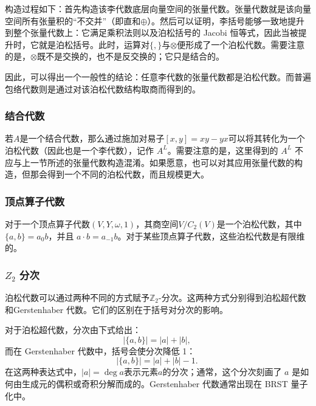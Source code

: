 构造过程如下：首先构造该李代数底层向量空间的张量代数。张量代数就是该向量空间所有张量积的“不交并”（即直和$\oplus$）。然后可以证明，李括号能够一致地提升到整个张量代数上：它满足乘积法则以及泊松括号的 Jacobi 恒等式，因此当被提升时，它就是泊松括号。此时，运算对$\{,\}$与$\otimes$便形成了一个泊松代数。需要注意的是，$\otimes$既不是交换的，也不是反交换的；它只是结合的。

因此，可以得出一个一般性的结论：任意李代数的张量代数都是泊松代数。而普遍包络代数则是通过对该泊松代数结构取商而得到的。
\subsubsection{结合代数}
若$A$是一个结合代数，那么通过施加对易子$[x,y] = xy - yx$可以将其转化为一个泊松代数（因此也是一个李代数），记作 $A^L$。需要注意的是，这里得到的 $A^L$ 不应与上一节所述的张量代数构造混淆。如果愿意，也可以对其应用张量代数的构造，但那会得到一个不同的泊松代数，而且规模更大。
\subsubsection{顶点算子代数}
对于一个顶点算子代数$(V, Y, \omega, 1)$，其商空间$V / C_2(V)$是一个泊松代数，其中$\{a, b\} = a_0 b$，并且 $a \cdot b = a_{-1} b$。对于某些顶点算子代数，这些泊松代数是有限维的。
\subsubsection{ \(Z_2\) 分次}
泊松代数可以通过两种不同的方式赋予$\mathbb{Z}_2$-分次。这两种方式分别得到泊松超代数和Gerstenhaber 代数。它们的区别在于括号对分次的影响。

对于泊松超代数，分次由下式给出：
$$
|\{a,b\}| = |a| + |b|,~
$$
而在 Gerstenhaber 代数中，括号会使分次降低 1：
$$
|\{a,b\}| = |a| + |b| - 1.~
$$
在这两种表达式中，$|a| = \deg a$表示元素$a$的分次；通常，这个分次刻画了 $a$ 是如何由生成元的偶积或奇积分解而成的。Gerstenhaber 代数通常出现在 BRST 量子化中。
